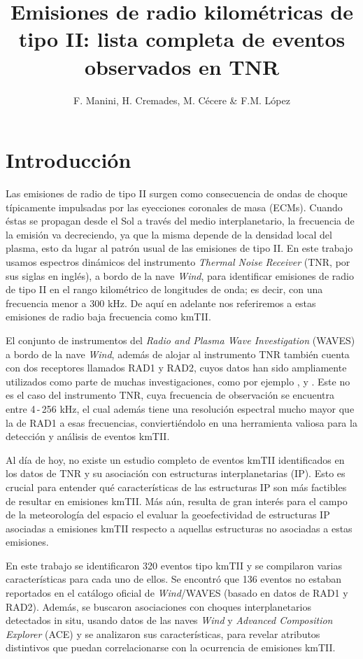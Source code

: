 \documentclass[baaa]{baaa}
\title{Emisiones de radio kilom\'etricas de tipo II: lista completa de eventos observados en TNR}
\author{F. Manini\inst{1}, H. Cremades\inst{1}, M. Cécere \inst{2} \& F.M. L\'opez \inst{1}
}
\institute{
Grupo de Estudios en Heliofisica de Mendoza, Facultad de Ingeniería - Universidad de Mendoza, CONICET, Argentina
\and
Instituto de Astronom{\'\i}a Te\'orica y Experimental, CONICET--UNC, Argentina
}
\begin{document}
\maketitle
\section{Introducci\'on}\label{S_intro}

Las emisiones de radio de tipo II surgen como consecuencia de ondas de choque típicamente impulsadas por las eyecciones coronales de masa (ECMs). Cuando éstas se propagan desde el Sol a través del medio interplanetario, la frecuencia de la emisión va decreciendo, ya que la misma depende de la densidad local del plasma, esto da lugar al patrón usual de las emisiones de tipo II.
En este trabajo usamos espectros dinámicos del instrumento \textit{Thermal Noise Receiver} (TNR, por sus siglas en inglés), a bordo de la nave \textit{Wind}, para identificar emisiones de radio de tipo II en el rango kilométrico de longitudes de onda; es decir, con una frecuencia menor a 300 kHz. De aquí en adelante nos referiremos a estas emisiones de radio baja frecuencia como kmTII.

El conjunto de instrumentos del \textit{Radio and Plasma Wave Investigation} (WAVES) \citep{Bougeret95} a bordo de la nave \textit{Wind}, además de alojar al instrumento TNR también cuenta con dos receptores llamados RAD1 y RAD2, cuyos datos han sido ampliamente utilizados como parte de muchas investigaciones, como por ejemplo \cite{gopal}, \cite{krupar} y \cite{makela}. Este no es el caso del instrumento TNR, cuya frecuencia de observación se encuentra entre 4\,-\,256 kHz, el cual además tiene una resolución espectral mucho mayor que la de RAD1 a esas frecuencias, conviertiéndolo en una herramienta valiosa para la detección y análisis de eventos kmTII.

Al día de hoy, no existe un estudio completo de eventos kmTII identificados en los datos de TNR y su asociación con estructuras interplanetarias (IP). Esto es crucial para entender qué características de las estructuras IP son más factibles de resultar en emisiones kmTII. Más aún, resulta de gran interés para el campo de la meteorología del espacio el evaluar la geoefectividad de estructuras IP asociadas a emisiones kmTII respecto a aquellas estructuras no asociadas a estas emisiones.

En este trabajo se identificaron 320 eventos tipo kmTII y se compilaron varias características para cada uno de ellos. Se encontró que 136 eventos no estaban reportados en el catálogo oficial de \textit{Wind}/WAVES (basado en datos de RAD1 y RAD2).
Además, se buscaron asociaciones con choques interplanetarios detectados in situ, usando datos de las naves \textit{Wind} y \textit{Advanced Composition Explorer} (ACE) y se analizaron sus características, para revelar atributos distintivos que puedan correlacionarse con la ocurrencia de emisiones kmTII.
\end{document}

